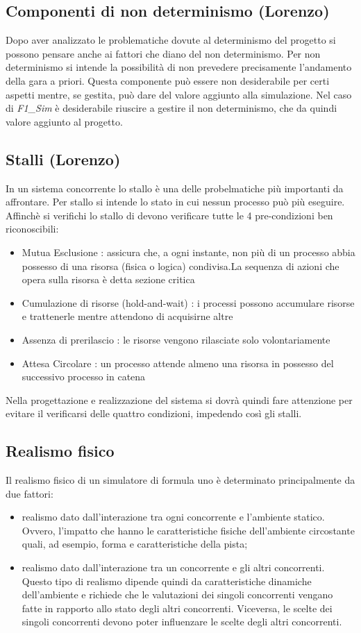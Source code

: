 \subsection{Componenti di non determinismo (Lorenzo)}
Dopo aver analizzato le problematiche dovute al determinismo del progetto si possono pensare anche ai fattori che diano del non determinismo.
Per non determinismo si intende la possibilit\`{a} di non prevedere precisamente l'andamento della gara a priori. Questa componente pu\`{o} essere non desiderabile per certi aspetti mentre, se gestita, pu\`{o} dare del valore aggiunto alla simulazione. Nel caso di \emph{F1\_Sim} \`{e} desiderabile riuscire a gestire il non determinismo, che da quindi valore aggiunto al progetto.
\subsection{Stalli (Lorenzo)}
In un sistema concorrente lo stallo è una delle probelmatiche pi\`{u} importanti da affrontare. Per stallo si intende lo stato in cui nessun processo pu\`{o} pi\`{u} eseguire. Affinch\`{e} si verifichi lo stallo di devono verificare tutte le 4 pre-condizioni ben riconoscibili:
\begin{itemize}
\item {Mutua Esclusione :} assicura che, a ogni instante, non pi\`{u} di un processo abbia possesso di una risorsa (fisica o logica) condivisa.La sequenza di azioni che opera sulla risorsa \`{e} detta sezione critica
\item{Cumulazione di risorse (hold-and-wait) :} i processi possono accumulare risorse e trattenerle mentre attendono di acquisirne altre
\item{Assenza di prerilascio :} le risorse vengono rilasciate solo volontariamente
\item{Attesa Circolare :} un processo attende almeno una risorsa in possesso del successivo processo in catena
\end{itemize}
Nella progettazione e realizzazione del sistema si dovr\`{a} quindi fare attenzione per evitare il verificarsi delle quattro condizioni, impedendo cos\`{i} gli stalli.
\subsection{Realismo fisico}
Il realismo fisico di un simulatore di formula uno è determinato principalmente da due fattori:
\begin{itemize}
\item realismo dato dall'interazione tra ogni concorrente e l'ambiente statico. Ovvero, l'impatto che hanno
le caratteristiche fisiche dell'ambiente circostante quali, ad esempio, forma e caratteristiche della pista;
\item realismo dato dall'interazione tra un concorrente e gli altri concorrenti. Questo tipo di realismo 
dipende quindi da caratteristiche dinamiche dell'ambiente e richiede che le valutazioni dei singoli concorrenti
vengano fatte in rapporto allo stato degli altri concorrenti. Viceversa, le scelte dei singoli concorrenti
devono poter influenzare le scelte degli altri concorrenti.
\end{itemize}
